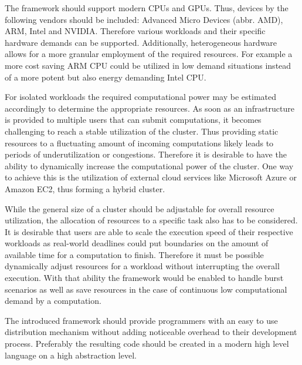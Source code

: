 \begin{description}[style=nextline]
    \item [Heterogeneity]
    The framework should support modern CPUs and GPUs. Thus, devices by the following vendors should be included: Advanced Micro Devices (abbr. AMD), ARM, Intel and NVIDIA. Therefore various workloads and their specific hardware demands can be supported. Additionally, heterogeneous hardware allows for a more granular employment of the required resources. For example a more cost saving ARM CPU could be utilized in low demand situations instead of a more potent but also energy demanding Intel CPU.

    \item [Resource Scalability]
    For isolated workloads the required computational power may be estimated accordingly to determine the appropriate resources. As soon as an infrastructure is provided to multiple users that can submit computations, it becomes challenging to reach a stable utilization of the cluster. Thus providing static resources to a fluctuating amount of incoming computations likely leads to periods of underutilization or congestions. Therefore it is desirable to have the ability to dynamically increase the computational power of the cluster. One way to achieve this is the utilization of external cloud services like Microsoft Azure or Amazon EC2, thus forming a hybrid cluster.

    \item [Scalable Speed]
    While the general size of a cluster should be adjustable for overall resource utilization, the allocation of resources to a specific task also has to be considered. It is desirable that users are able to scale the execution speed of their respective workloads as real-world deadlines could put boundaries on the amount of available time for a computation to finish. Therefore it must be possible dynamically adjust resources for a workload without interrupting the overall execution. With that ability the framework would be enabled to handle burst scenarios as well as save resources in the case of continuous low computational demand by a computation.

    \item [Ease of Programming]
    The introduced framework should provide programmers with an easy to use distribution mechanism without adding noticeable overhead to their development process. Preferably the resulting code should be created in a modern high level language on a high abstraction level.


\end{description}
